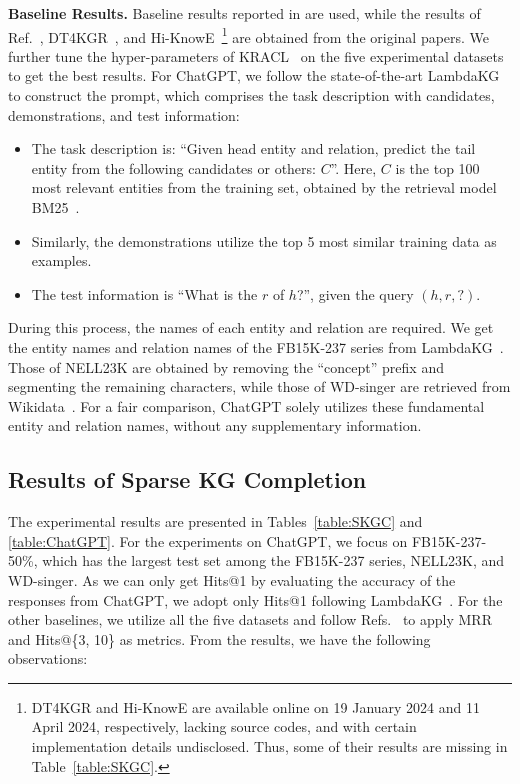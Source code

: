 \documentclass[sigconf]{acmart}
\begin{document}
\textbf{Baseline Results.} Baseline results reported in \cite{SparKGR} are used, while the results of Ref.~\cite{SKG2023-Application}, DT4KGR~\cite{DT4KGR}, and Hi-KnowE~\cite{Hi-KnowE}\footnote{DT4KGR and Hi-KnowE are available online on 19 January 2024 and 11 April 2024, respectively, lacking source codes, and with certain implementation details undisclosed. Thus, some of their results are missing in Table~\ref{table:SKGC}.} are obtained from the original papers. We further tune the hyper-parameters of KRACL~\cite{SKGC2023-KRACL} on the five experimental datasets to get the best results. For ChatGPT, we follow the state-of-the-art LambdaKG~\cite{LambdaKG} to construct the prompt, which comprises the task description with candidates, demonstrations, and test information:
\begin{itemize}
	\item The task description is: ``Given head entity and relation, predict the tail entity from the following candidates or others: $C$''. Here, $C$ is the top 100 most relevant entities from the training set, obtained by the retrieval model BM25~\cite{BM25}.
	\item Similarly, the demonstrations utilize the top 5 most similar training data as examples.
	\item The test information is ``What is the $r$ of $h$?'', given the query $(h, r, ?)$.
\end{itemize}
During this process, the names of each entity and relation are required. We get the entity names and relation names of the FB15K-237 series from LambdaKG~\cite{LambdaKG}. Those of NELL23K are obtained by removing the ``concept'' prefix and segmenting the remaining characters, while those of WD-singer are retrieved from Wikidata~\cite{Wikidata}. For a fair comparison, ChatGPT solely utilizes these fundamental entity and relation names, without any supplementary information.

\subsection{Results of Sparse KG Completion}
\label{subsec:SKGC_results}
The experimental results are presented in Tables~\ref{table:SKGC} and \ref{table:ChatGPT}. For the experiments on ChatGPT, we focus on FB15K-237-50\%, which has the largest test set among the FB15K-237 series, NELL23K, and WD-singer. As we can only get Hits@1 by evaluating the accuracy of the responses from ChatGPT, we adopt only Hits@1 following LambdaKG~\cite{LambdaKG}. For the other baselines, we utilize all the five datasets and follow Refs.~\cite{DacKGR,SparKGR,SKG2023-Application} to apply MRR and Hits@\{3, 10\} as metrics. From the results, we have the following observations:
\end{document}

